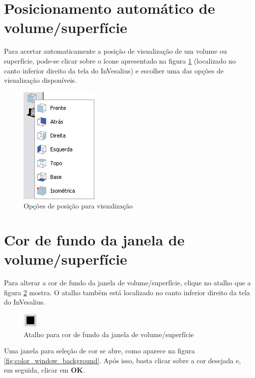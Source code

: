 \newpage

\section{Posicionamento automático de volume/superfície}

Para acertar automaticamente a posição de visualização de um volume ou superfície,
pode-se clicar sobre o ícone apresentado na figura \ref{fig:3d_automatic_position}
(localizado no canto inferior direito da tela do InVesalius) e escolher uma das
opções de visualização disponíveis.

\begin{figure}[!htb]
\centering
\includegraphics[scale=0.45]{../user_guide_figures/invesalius_screen/3d_automatic_position.png}
\caption{Opções de posição para visualização}
\label{fig:3d_automatic_position}
\end{figure}

\section{Cor de fundo da janela de volume/superfície}

Para alterar a cor de fundo da janela de volume/superfície, clique no atalho que a figura
\ref{fig:button_select_color_2} mostra. O atalho também está localizado no canto inferior
direito da tela do InVesalius.

\begin{figure}[!htb]
\centering
\includegraphics[scale=0.8]{../user_guide_figures/invesalius_screen/colour_button.png}
\caption{Atalho para cor de fundo da janela de volume/superfície}
\label{fig:button_select_color_2}
\end{figure}

Uma janela para seleção de cor se abre, como aparece na figura \ref{fig:color_window_background}.
Após isso, basta clicar sobre a cor desejada e, em seguida, clicar em \textbf{OK}.

